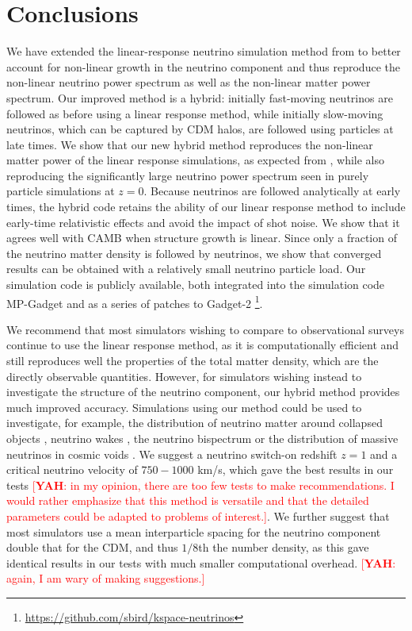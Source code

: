 \documentclass[useAMS, usenatbib]{mnras}
\newcommand{\yah}[1]{{\textcolor{red}{[{\bf YAH}: #1]}}}
\begin{document}
\section{Conclusions}
\label{sec:conclusion}

We have extended the linear-response neutrino simulation method from \cite{AHB} to better account for non-linear growth in the neutrino component and thus reproduce the non-linear neutrino power spectrum as well as the non-linear matter power spectrum.
Our improved method is a hybrid: initially fast-moving neutrinos are followed as before using a linear response method, while initially slow-moving neutrinos, which can be captured by CDM halos, are followed using particles at late times. We show that our new hybrid method reproduces the non-linear matter power of the linear response simulations, as expected from \cite{AHB}, while also reproducing the significantly large neutrino power spectrum seen in purely particle simulations at $z=0$. Because neutrinos are followed analytically at early times, the hybrid code retains the ability of our linear response method to include early-time relativistic effects and avoid the impact of shot noise. We show that it agrees well with CAMB when structure growth is linear. Since only a fraction of the neutrino matter density is followed by neutrinos, we show that converged results can be obtained with a relatively small neutrino particle load. Our simulation code is publicly available, both integrated into the simulation code MP-Gadget and as a series of patches to Gadget-2 \footnote{\url{https://github.com/sbird/kspace-neutrinos}}.

We recommend that most simulators wishing to compare to observational surveys continue to use the linear response method, as it is computationally efficient and still reproduces well the properties of the total matter density, which are the directly observable quantities. However, for simulators wishing instead to investigate the structure of the neutrino component, our hybrid method provides much improved accuracy. Simulations using our method could be used to investigate, for example, the distribution of neutrino matter around collapsed objects \citep{FVN_2013}, neutrino wakes \citep{Inman_2015}, the neutrino bispectrum \citep{Furhrer_2015} or the distribution of massive neutrinos in cosmic voids \citep{Banerjee_2016}. We suggest a neutrino switch-on redshift $z=1$ and a critical neutrino velocity of $750-1000$ km/s, which gave the best results in our tests \yah{in my opinion, there are too few tests to make recommendations. I would rather emphasize that this method is versatile and that the detailed parameters could be adapted to problems of interest.}. We further suggest that most simulators use a mean interparticle spacing for the neutrino component double that for the CDM, and thus $1/8$th the number density, as this gave identical results in our tests with much smaller computational overhead. \yah{again, I am wary of making suggestions.}
\end{document}
